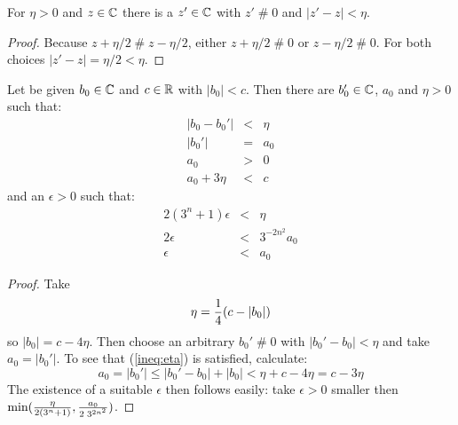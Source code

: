 \begin{lemma}\label{lemma:nzc}
For $\eta > 0$ and $z\in\mathbb{C}$ there is a $z'\in\mathbb{C}$ with $z' \mathrel{\#} 0$ and $|z' - z| < \eta$.
\end{lemma}
\begin{proof}
Because $z + \eta/2 \mathrel{\#} z - \eta/2$, either $z + \eta/2 \mathrel{\#} 0$ or
$z - \eta/2 \mathrel{\#} 0$.  For both choices $|z' - z| = \eta/2 < \eta$.
\end{proof}
\begin{lemma}\label{lemma:eps}
Let be given $b_0\in\mathbb{C}$ and $c\in\mathbb{R}$ with $|b_0| < c$.
Then there are $b_0'\in\mathbb{C}$, $a_0$ and $\eta > 0$ such that:
\begin{eqnarray}
|b_0 - b_0'| &<& \eta\\
|b_0'| &=& a_0\\
a_0 &>& 0\\
a_0 + 3\eta &<& c  \label{ineq:eta}
\end{eqnarray}
and an $\epsilon > 0$ such that:
\begin{eqnarray}
2(3^n + 1)\epsilon &<& \eta  \label{ineq:epsilon}\\
2\epsilon &<& 3^{-2n^2} a_0\\
\epsilon &<& a_0
\end{eqnarray}
\end{lemma}
\begin{proof}
Take
$$\eta = {1\over 4}(c - |b_0|)$$
so $|b_0| = c - 4\eta$.
Then choose an arbitrary $b_0' \mathrel{\#} 0$ with $|b_0' - b_0| < \eta$ and take $a_0 = |b_0'|$.
To see that (\ref{ineq:eta}) is satisfied, calculate:
$$a_0 = |b_0'| \le |b_0' - b_0| + |b_0| < \eta + c - 4\eta = c - 3\eta$$
%
The existence of a suitable $\epsilon$ then follows easily: take
$\epsilon>0$ smaller then $\mbox{min}(\frac{\eta}{2(3^{n}+1)},
\frac{a_0}{2\;3^{2n^2}})$.
\end{proof}

